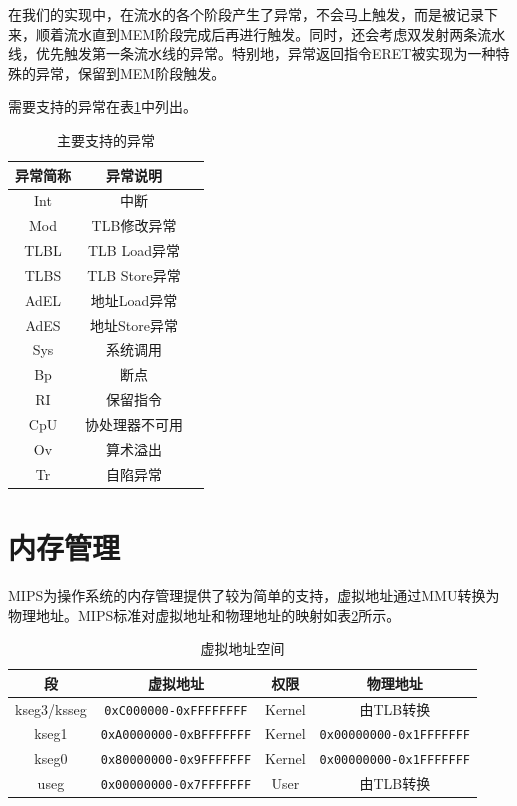 在我们的实现中，在流水的各个阶段产生了异常，不会马上触发，而是被记录下来，顺着流水直到MEM阶段完成后再进行触发。同时，还会考虑双发射两条流水线，优先触发第一条流水线的异常。特别地，异常返回指令ERET被实现为一种特殊的异常，保留到MEM阶段触发。

需要支持的异常在表\ref{table:main-exception}中列出。

\begin{table}[htbp]
	\centering
	\begin{tabular}{|c|c|l|} \hline
		\textbf{异常简称} & \textbf{异常说明} \\ \hline
		Int & 中断  \\ \hline
		Mod & TLB修改异常 \\ \hline
		TLBL & TLB Load异常 \\ \hline
		TLBS & TLB Store异常 \\ \hline
		AdEL & 地址Load异常 \\ \hline
		AdES & 地址Store异常 \\ \hline
		Sys & 系统调用 \\ \hline
		Bp & 断点 \\ \hline
		RI & 保留指令 \\ \hline
		CpU & 协处理器不可用 \\ \hline
		Ov & 算术溢出 \\ \hline
		Tr & 自陷异常 \\ \hline
	\end{tabular}
	\caption{主要支持的异常}
	\label{table:main-exception}
\end{table}
\section{内存管理}
MIPS为操作系统的内存管理提供了较为简单的支持，虚拟地址通过MMU转换为物理地址。MIPS标准对虚拟地址和物理地址的映射如表\ref{tab:virtual-address-space}所示。

\begin{table}[htbp]
	\centering
	\begin{tabular}{|c|c|c|c|} \hline
		\textbf{段} & \textbf{虚拟地址} & \textbf{权限} & \textbf{物理地址} \\ \hline
		kseg3/ksseg & \texttt{0xC000000-0xFFFFFFFF} & Kernel & 由TLB转换 \\ \hline
		kseg1 & \texttt{0xA0000000-0xBFFFFFFF} & Kernel & \texttt{0x00000000-0x1FFFFFFF} \\ \hline
		kseg0 & \texttt{0x80000000-0x9FFFFFFF} & Kernel & \texttt{0x00000000-0x1FFFFFFF} \\ \hline
		useg &  \texttt{0x00000000-0x7FFFFFFF} & User & 由TLB转换 \\ \hline
	\end{tabular}
	\caption{虚拟地址空间}
	\label{tab:virtual-address-space}
\end{table}

